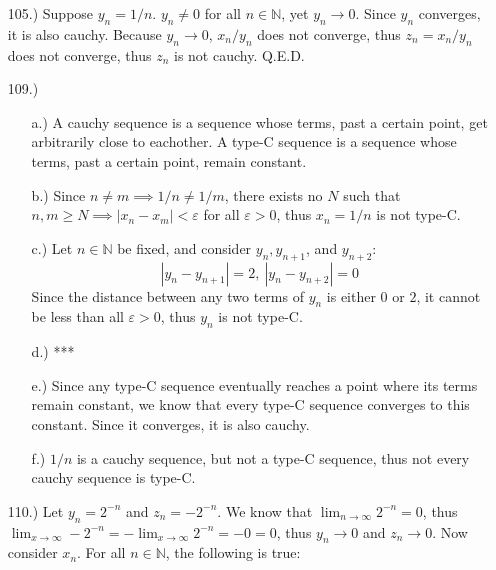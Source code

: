 \documentclass[12pt]{article}
\newcommand{\vertb}[1]{\left\vert#1\right\vert}
\newcommand{\e}{\varepsilon}
\newcommand{\lm}[1]{\displaystyle\lim_{#1}}
\begin{document}
\begin{itemize}
    \item [105.)] Suppose $y_n=1/n$. $y_n\ne0$ for all $n\in\mathbb{N}$, yet $y_n\to0$. Since $y_n$ converges, it is also cauchy. Because $y_n\to0$, $x_n/y_n$ does not converge, thus $z_n=x_n/y_n$ does not converge, thus $z_n$ is not cauchy. Q.E.D.




    \item [109.)] \begin{itemize}
        \item [a.)] A cauchy sequence is a sequence whose terms, past a certain point, get arbitrarily close to eachother. A type-C sequence is a sequence whose terms, past a certain point, remain constant.

        \item [b.)] Since $n\neq m\implies1/n\ne1/m$, there exists no $N$ such that $n,m\geq N\implies\vertb{x_n-x_m}<\e$ for all $\e>0$, thus $x_n=1/n$ is not type-C.

        \item [c.)] Let $n\in\mathbb{N}$ be fixed, and consider $y_n,y_{n+1}$, and $y_{n+2}$:
        \[\vertb{y_n-y_{n+1}}=2,\ \vertb{y_n-y_{n+2}}=0\]
        Since the distance between any two terms of $y_n$ is either $0$ or $2$, it cannot be less than all $\e>0$, thus $y_n$ is not type-C.

        \item [d.)] ***

        \item [e.)] Since any type-C sequence eventually reaches a point where its terms remain constant, we know that every type-C sequence converges to this constant. Since it converges, it is also cauchy.

        \item [f.)] $1/n$ is a cauchy sequence, but not a type-C sequence, thus not every cauchy sequence is type-C.
    \end{itemize}

    \item [110.)] Let $y_n=2^{-n}$ and $z_n=-2^{-n}$. We know that $\lm{n\to\infty}2^{-n}=0$, thus $\lm{x\to\infty}-2^{-n}=-\lm{x\to\infty}2^{-n}=-0=0$, thus $y_n\to0$ and $z_n\to0$. Now consider $x_n$. For all $n\in\mathbb{N}$, the following is true:


\end{itemize}
\end{document}
